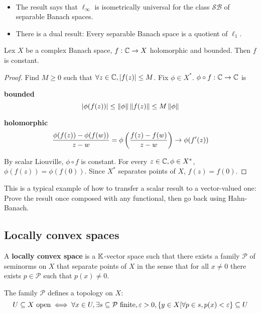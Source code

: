 \documentclass{article}
\begin{document}
\newlec

\begin{rmks}~
  \begin{itemize}
    \item The result says that $\ell_\infty$ is isometrically universal for the class $\mathcal{SB}$ of separable Banach spaces.
    \item There is a dual result: Every separable Banach space is a quotient of $\ell_1$.
  \end{itemize}
\end{rmks}

\begin{nthm}
  Lex $X$ be a complex Banach space, $f : \mathbb C \rightarrow X$ holomorphic and bounded. Then $f$ is constant.
\end{nthm}
\begin{proof}
  Find $M \ge 0$ such that $\forall z \in \mathbb C, \left\lvert f(z)\right\rvert \le M$. Fix $\phi \in X^*$. $\phi \circ f : \mathbb C \rightarrow \mathbb C$ is

  {\bf bounded}
  $$\left\lvert \phi(f(z))\right\rvert \le \left\lVert \phi\right\rVert \left\lVert f(z)\right\rVert \le M\left\lVert \phi\right\rVert$$

  {\bf holomorphic}
  $$\frac{\phi(f(z)) - \phi(f(w))}{z - w} = \phi\left(\frac{f(z) - f(w)}{z - w}\right) \rightarrow \phi(f'(z))$$

  By scalar Liouville, $\phi \circ f$ is constant. For every $z \in \mathbb C, \phi \in X^*$, $\phi(f(z)) = \phi(f(0))$. Since $X^*$ separates points of $X$, $f(z) = f(0)$.
\end{proof}

\begin{rmk}
  This is a typical example of how to transfer a scalar result to a vector-valued one: Prove the result once composed with any functional, then go back using Hahn-Banach.
\end{rmk}

\subsection{Locally convex spaces}

\begin{defi}
  A {\bf locally convex space} is a $\mathbb K$-vector space such that there exists a family $\mathcal P$ of seminorms on $X$ that separate points of $X$ in the sense that for all $x \ne 0$ there exists $p \in \mathcal P$ such that $p(x) \ne 0$.
\end{defi}

The family $\mathcal P$ defines a topology on $X$:
$$U \subseteq X \text{ open} \iff \forall x \in U, \exists s \subseteq \mathcal P \text{ finite}, \varepsilon > 0, \{y \in X | \forall p \in s, p(x) < \varepsilon\} \subseteq U$$
\end{document}
